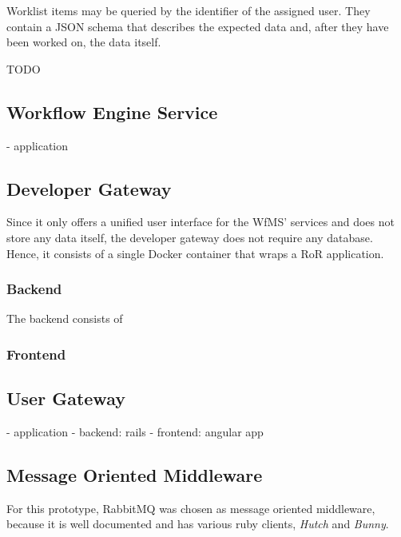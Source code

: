       Worklist items may be queried by the identifier of the assigned user. They contain a JSON schema that describes the expected data and, after they have been worked on, the data itself.

      TODO

  \subsection{Workflow Engine Service} %
    \label{sub:workflow_engine_service}
      - application

  \subsection{Developer Gateway} %
    \label{sub:developer_gateway}

      Since it only offers a unified user interface for the \ac{WfMS}' services and does not store any data itself, the developer gateway does not require any database. Hence, it consists of a single Docker container that wraps a \ac{RoR} application.

      \subsubsection{Backend} %
      \label{ssub:backend}
        The backend consists of


      \subsubsection{Frontend} %
        \label{ssub:frontend}



  \subsection{User Gateway} %
    \label{sub:user_gateway}
      - application
        - backend: rails
        - frontend: angular app

  \subsection{Message Oriented Middleware} %
    \label{sub:message_oriented_middleware}
      For this prototype, RabbitMQ was chosen as message oriented middleware, because it is well documented and has various ruby clients, \eg \emph{Hutch} and \emph{Bunny}.

